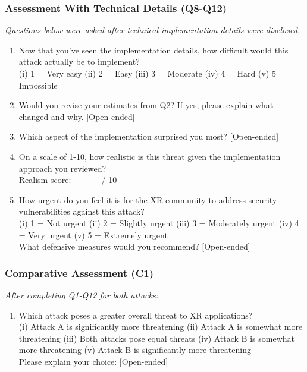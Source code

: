 \documentclass[letterpaper,twocolumn,10pt]{article}
\begin{document}
\subsubsection{Assessment With Technical Details (Q8-Q12)}
\textit{Questions below were asked after technical implementation details were disclosed.}

\begin{enumerate}
    \item[Q8.] Now that you've seen the implementation details, how difficult would this attack actually be to implement? \\(i) 1 = Very easy (ii) 2 = Easy (iii) 3 = Moderate (iv) 4 = Hard (v) 5 = Impossible
    
    \item[Q9.] Would you revise your estimates from Q2? If yes, please explain what changed and why. [Open-ended]
    
    \item[Q10.] Which aspect of the implementation surprised you most? [Open-ended]
    
    \item[Q11.] On a scale of 1-10, how realistic is this threat given the implementation approach you reviewed? \\Realism score: \_\_\_\_ / 10
    
    \item[Q12.] How urgent do you feel it is for the XR community to address security vulnerabilities against this attack? \\(i) 1 = Not urgent (ii) 2 = Slightly urgent (iii) 3 = Moderately urgent (iv) 4 = Very urgent (v) 5 = Extremely urgent \\What defensive measures would you recommend? [Open-ended]
\end{enumerate}

\subsubsection{Comparative Assessment (C1)}
\textit{After completing Q1-Q12 for both attacks:}

\begin{enumerate}
    \item[C1.] Which attack poses a greater overall threat to XR applications? \\(i) Attack A is significantly more threatening (ii) Attack A is somewhat more threatening (iii) Both attacks pose equal threats (iv) Attack B is somewhat more threatening (v) Attack B is significantly more threatening \\Please explain your choice: [Open-ended]
\end{enumerate}
\end{document}
